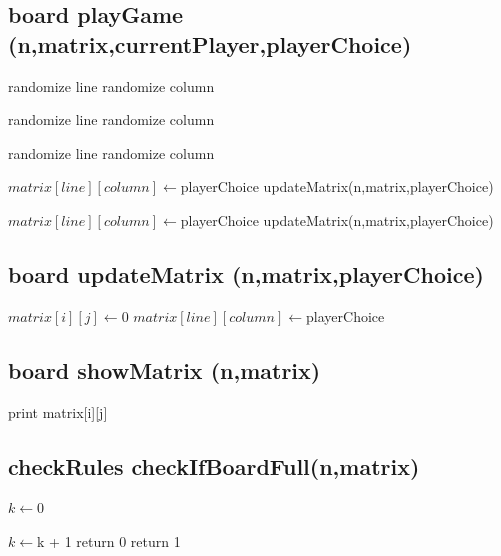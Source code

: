 \documentclass[12]{article}
\begin{document}
\subsection{board playGame (n,matrix,currentPlayer,playerChoice)}
\begin{algorithmic}[1]
\STATE randomize line
\STATE randomize column

		\STATE randomize line
		\STATE randomize column
	\ENDIF
	
		\STATE randomize line
		\STATE randomize column
	\ENDIF
\ENDWHILE

	\STATE $matrix[line][column] \gets $playerChoice
	\STATE updateMatrix(n,matrix,playerChoice)
\ENDIF

	\STATE  $matrix[line][column] \gets $playerChoice
	\STATE updateMatrix(n,matrix,playerChoice)
\ENDIF
 
\end{algorithmic}

\subsection{board updateMatrix (n,matrix,playerChoice)}
\begin{algorithmic}[1]
			\STATE $ matrix[i][j] \gets $0
		\ENDIF
			\STATE $matrix[line][column] \gets $playerChoice
	\ENDFOR
\ENDFOR

\end{algorithmic}

\subsection{board showMatrix (n,matrix)}
\begin{algorithmic}[1]

		\STATE print matrix[i][j]
	\ENDFOR
	
\ENDFOR

\end{algorithmic}

\subsection{checkRules checkIfBoardFull(n,matrix)}
\begin{algorithmic}[1]

\STATE $k \gets $0

			\STATE $k \gets $k + 1
		\ENDIF
	\ENDFOR
		\STATE return 0
	\ENDIF
		\STATE return 1
\ENDFOR
\end{algorithmic}
\end{document}
